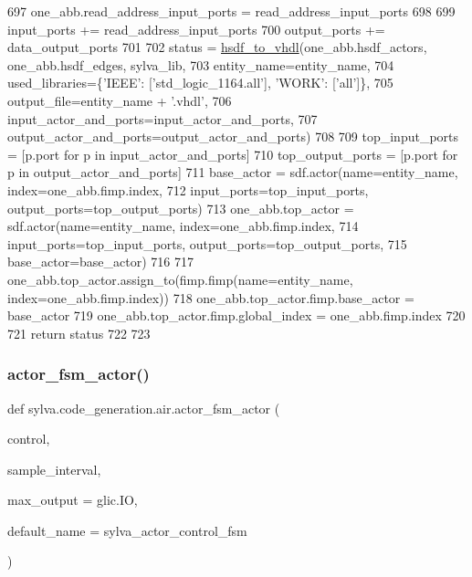 \begin{DoxyCode}
697         one\_abb.read\_address\_input\_ports = read\_address\_input\_ports
698 
699         input\_ports += read\_address\_input\_ports
700         output\_ports += data\_output\_ports
701 
702     status = \hyperlink{namespacesylva_1_1code__generation_1_1hsdf__to__vhdl_a0725288caa57a5c518a1b9c2683291fa}{hsdf\_to\_vhdl}(one\_abb.hsdf\_actors, one\_abb.hsdf\_edges, sylva\_lib,
703                           entity\_name=entity\_name,
704                           used\_libraries=\{\textcolor{stringliteral}{'IEEE'}: [\textcolor{stringliteral}{'std\_logic\_1164.all'}], \textcolor{stringliteral}{'WORK'}: [\textcolor{stringliteral}{'all'}]\},
705                           output\_file=entity\_name + \textcolor{stringliteral}{'.vhdl'},
706                           input\_actor\_and\_ports=input\_actor\_and\_ports,
707                           output\_actor\_and\_ports=output\_actor\_and\_ports)
708 
709     top\_input\_ports = [p.port \textcolor{keywordflow}{for} p \textcolor{keywordflow}{in} input\_actor\_and\_ports]
710     top\_output\_ports = [p.port \textcolor{keywordflow}{for} p \textcolor{keywordflow}{in} output\_actor\_and\_ports]
711     base\_actor = sdf.actor(name=entity\_name, index=one\_abb.fimp.index,
712                            input\_ports=top\_input\_ports, output\_ports=top\_output\_ports)
713     one\_abb.top\_actor = sdf.actor(name=entity\_name, index=one\_abb.fimp.index,
714                                   input\_ports=top\_input\_ports, output\_ports=top\_output\_ports,
715                                   base\_actor=base\_actor)
716 
717     one\_abb.top\_actor.assign\_to(fimp.fimp(name=entity\_name, index=one\_abb.fimp.index))
718     one\_abb.top\_actor.fimp.base\_actor = base\_actor
719     one\_abb.top\_actor.fimp.global\_index = one\_abb.fimp.index
720 
721     \textcolor{keywordflow}{return} status
722 
723 
\end{DoxyCode}
\mbox{\label{namespacesylva_1_1code__generation_1_1air_a29263a2d50cecb3cf4e5aa3b684c4666}} 
\subsubsection{\texorpdfstring{actor\+\_\+fsm\+\_\+actor()}{actor\_fsm\_actor()}}
{\footnotesize\ttfamily def sylva.\+code\+\_\+generation.\+air.\+actor\+\_\+fsm\+\_\+actor (\begin{DoxyParamCaption}\item[{}]{control,  }\item[{}]{sample\+\_\+interval,  }\item[{}]{max\+\_\+output = {\ttfamily glic.IO},  }\item[{}]{default\+\_\+name = {\ttfamily \textquotesingle{}sylva\+\_\+actor\+\_\+control\+\_\+fsm\textquotesingle{}} }\end{DoxyParamCaption})}



